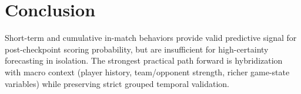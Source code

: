 \documentclass[11pt, a4paper]{article}
\begin{document}
\section{Conclusion}
Short-term and cumulative in-match behaviors provide valid predictive signal for post-checkpoint scoring probability, but are insufficient for high-certainty forecasting in isolation. The strongest practical path forward is hybridization with macro context (player history, team/opponent strength, richer game-state variables) while preserving strict grouped temporal validation.
\end{document}
